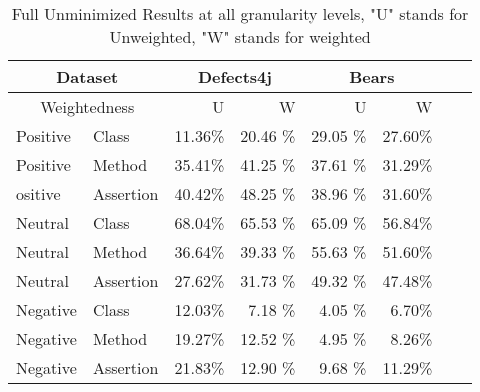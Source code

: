 \documentclass[sigconf, timestamp-false, anonymous=true]{acmart}
\begin{document}
\begin{table}
{\begin{center}
\begin{tabular}{| l | l | r | r | r | r | r | r |}
\hline
\multicolumn{2}{|c|}{Dataset} &\multicolumn{2}{|c|}{Defects4j} & \multicolumn{2}{|c|}{Bears} \\
\hline
\multicolumn{2}{|c|}{Weightedness} & U & W & U & W  \\
\hline
Positive & Class & 11.36\% & 20.46 \% & 29.05 \% & 27.60\%  \\
Positive & Method & 35.41\% & 41.25 \% & 37.61 \% & 31.29\%  \\
ositive & Assertion & 40.42\% & 48.25 \% & 38.96 \% & 31.60\%  \\ 
\hline
Neutral & Class & 68.04\% & 65.53 \% & 65.09 \% & 56.84\% \\
Neutral & Method & 36.64\% & 39.33 \% & 55.63 \% & 51.60\%  \\
Neutral & Assertion & 27.62\% & 31.73 \% & 49.32 \% &  47.48\%  \\ 
\hline
Negative & Class & 12.03\% & 7.18 \% & 4.05 \% & 6.70\%  \\
Negative & Method & 19.27\% & 12.52 \% & 4.95 \% & 8.26\%  \\
Negative & Assertion & 21.83\% & 12.90 \% & 9.68 \% &  11.29\%  \\ 
\hline
\end{tabular}
\end{center}}
\caption{Full Unminimized Results at all granularity levels, "U" stands for Unweighted, "W" stands for weighted}
\end{table}
\end{document}
